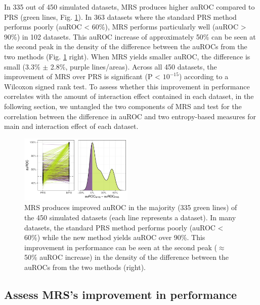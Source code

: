 \documentclass[a4paper,twoside, 9pt]{article}
\begin{document}
\noindent In 335 out of 450 simulated datasets, MRS produces higher auROC compared
to PRS (green lines, Fig. \ref{fig:auroc_mrs_prs}). In 363 datasets
where the standard PRS method performs poorly (auROC \textless{} 60\%),
MRS performs particularly well (auROC \textgreater{} 90\%) in 102
datasets. This auROC increase of approximately 50\% can be seen at the second peak in the density of the difference between the auROCs from the two methods (Fig. \ref{fig:auroc_mrs_prs} right).
When MRS yields smaller auROC, the difference is small (3.3\%
$\pm$ 2.8\%, purple lines/areas). Across all 450 datasets, the improvement of
MRS over PRS is significant (P \textless{} \(10^{-15}\)) according to a
Wilcoxon signed rank test. To assess whether this improvement in
performance correlates with the amount of interaction effect contained
in each dataset, in the following section, we untangled the two
components of MRS and test for the correlation between the difference in
auROC and two entropy-based measures for main and interaction effect of
each dataset.

\begin{figure}
\centering
\includegraphics[width=0.48\textwidth]{images/1_ori_vs_MRS_auROC_.pdf}
\caption{MRS produces improved auROC in the majority (335 green lines)
of the 450 simulated datasets (each line represents a dataset). In many
datasets, the standard PRS method performs poorly (auROC \textless{}
60\%) while the new method yields auROC over 90\%. This improvement in
performance can be seen at the second peak ($\approx$ 50\% auROC
increase) in the density of the difference between the auROCs from the
two methods (right).}
\label{fig:auroc_mrs_prs}
\end{figure}

\hypertarget{assess-improvement-in-performance}{%
\subsection{Assess MRS's improvement in
performance}\label{assess-improvement-in-performance}}
\end{document}
